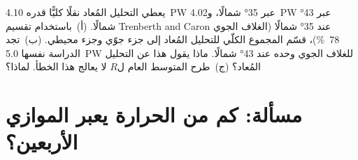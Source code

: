 \begin{exercise}[$\star\star\star$]\label{exo:b1:radiation-heat-transport:12}
يعطي التحليل المُعاد نقلًا كليًّا قدره \qty{4.10}{PW} عبر \ang{35} شمالًا، و\qty{4.02}{PW} عبر \ang{43} شمالًا. (أ)~باستخدام تقسيم Trenberth and Caron عند \ang{35} شمالًا (الغلاف الجوي \qty{78}{\percent})، قسّم المجموع الكلّي للتحليل المُعاد إلى جزء جوّي وجزء محيطي. (ب)~تجد الدراسة نفسها \qty{5.0}{PW} للغلاف الجوي وحده عند \ang{43} شمالًا. ماذا يقول هذا عن التحليل المُعاد؟ (ج)~طرح المتوسط العام ل$R$ لا يعالج هذا الخطأ. لماذا؟
\end{exercise}

\section{مسألة: كم من الحرارة يعبر الموازي الأربعين؟}


